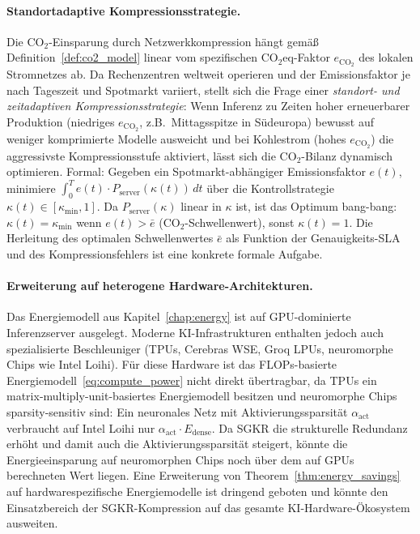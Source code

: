 \documentclass[12pt, a4paper, openany]{report}
\begin{document}
\paragraph{Standortadaptive Kompressionsstrategie.}
Die CO$_2$-Einsparung durch Netzwerkkompression hängt gemäß
Definition~\ref{def:co2_model} linear vom spezifischen CO$_2$eq-Faktor
$e_{\mathrm{CO_2}}$ des lokalen Stromnetzes ab.  Da Rechenzentren weltweit
operieren und der Emissionsfaktor je nach Tageszeit und Spotmarkt variiert,
stellt sich die Frage einer \emph{standort- und zeitadaptiven
Kompressionsstrategie}: Wenn Inferenz zu Zeiten hoher erneuerbarer
Produktion (niedriges $e_{\mathrm{CO_2}}$, z.B.\ Mittagsspitze in
Südeuropa) bewusst auf weniger komprimierte Modelle ausweicht und bei
Kohlestrom (hohes $e_{\mathrm{CO_2}}$) die aggressivste Kompressionsstufe
aktiviert, lässt sich die CO$_2$-Bilanz dynamisch optimieren.
Formal: Gegeben ein Spotmarkt-abhängiger Emissionsfaktor $e(t)$, minimiere
$\int_0^T e(t) \cdot P_{\mathrm{server}}(\kappa(t)) \,dt$ über die
Kontrollstrategie $\kappa(t) \in [\kappa_{\min}, 1]$.  Da
$P_{\mathrm{server}}(\kappa)$ linear in $\kappa$ ist, ist das Optimum
bang-bang: $\kappa(t) = \kappa_{\min}$ wenn $e(t) > \bar{e}$ (CO$_2$-Schwellenwert),
sonst $\kappa(t) = 1$.  Die Herleitung des optimalen Schwellenwertes $\bar{e}$
als Funktion der Genauigkeits-SLA und des Kompressionsfehlers ist eine
konkrete formale Aufgabe.

\paragraph{Erweiterung auf heterogene Hardware-Architekturen.}
Das Energiemodell aus Kapitel~\ref{chap:energy} ist auf GPU-dominierte
Inferenzserver ausgelegt.  Moderne KI-Infrastrukturen enthalten jedoch auch
spezialisierte Beschleuniger (TPUs, Cerebras WSE, Groq LPUs, neuromorphe
Chips wie Intel Loihi).  Für diese Hardware ist das FLOPs-basierte
Energiemodell~\eqref{eq:compute_power} nicht direkt übertragbar, da
TPUs ein matrix-multiply-unit-basiertes Energiemodell besitzen und
neuromorphe Chips sparsity-sensitiv sind: Ein neuronales Netz mit
Aktivierungssparsität $\alpha_{\mathrm{act}}$ verbraucht auf Intel Loihi
nur $\alpha_{\mathrm{act}} \cdot E_{\mathrm{dense}}$.  Da SGKR die
strukturelle Redundanz erhöht und damit auch die Aktivierungssparsität
steigert, könnte die Energieeinsparung auf neuromorphen Chips noch über
dem auf GPUs berechneten Wert liegen.  Eine Erweiterung von
Theorem~\ref{thm:energy_savings} auf hardware\-spezifische Energiemodelle
ist dringend geboten und könnte den Einsatzbereich der SGKR-Kompression
auf das gesamte KI-Hardware-Ökosystem ausweiten.
\end{document}
